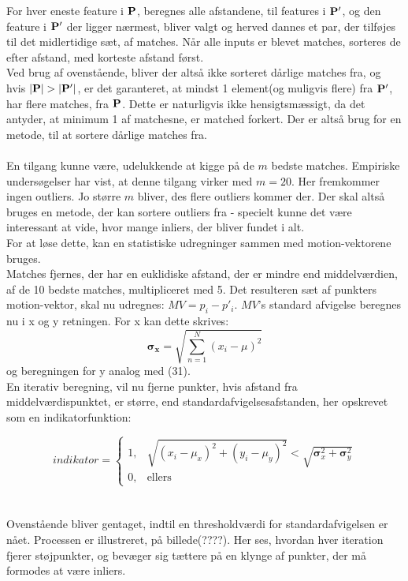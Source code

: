 For hver eneste feature i $\bold{P}$, beregnes alle afstandene, til features i $\bold{P}'$, og den feature i $\bold{P}'$ der ligger nærmest, bliver valgt og herved dannes et par, der tilføjes til det midlertidige sæt, af matches. Når alle inputs er blevet matches, sorteres de efter afstand, med korteste afstand først. 
\\
Ved brug af ovenstående, bliver der altså ikke sorteret dårlige matches fra, og hvis $|\bold{P}| > |\bold{P}'|$, er det garanteret, at mindst 1 element(og muligvis flere) fra $\bold{P}'$, har flere matches, fra $\bold{P}$. Dette er naturligvis ikke hensigtsmæssigt, da det antyder, at minimum 1 af matchesne, er matched forkert. Der er altså brug for en metode, til at sortere dårlige matches fra.
\\
\\
En tilgang kunne være, udelukkende at kigge på de $m$ bedste matches. Empiriske undersøgelser har vist, at denne tilgang virker med $m=20$. Her fremkommer ingen outliers. Jo større $m$ bliver, des flere outliers kommer der. Der skal altså bruges en metode, der kan sortere outliers fra - specielt kunne det være interessant at vide, hvor mange inliers, der bliver fundet i alt.
\\
For at løse dette, kan en statistiske udregninger sammen med motion-vektorene bruges. 
\\
Matches fjernes, der har en euklidiske afstand, der er mindre end middelværdien, af de 10 bedste matches, multipliceret med 5. Det resulteren sæt af punkters motion-vektor, skal nu udregnes: $MV = p_i - p'_i$. 
$MV$'s standard afvigelse beregnes nu i x og y retningen. For x kan dette skrives: 
\begin{equation}
\boldsymbol{\sigma_x} = \sqrt{ \sum \limits_{n=1}^N (x_i  - \mu)^2 }
\end{equation}
og beregningen for y analog med (31). \\
En iterativ beregning, vil nu fjerne punkter, hvis afstand fra middelværdispunktet, er større, end standardafvigelsesafstanden, her opskrevet som en indikatorfunktion:



\[
indikator=
\begin{cases}
    1,& \sqrt{(x_i - \mu_x)^2 + (y_i - \mu_y)^2} < \sqrt{\boldsymbol\sigma_x^2 + \boldsymbol\sigma_y^2} \\
    0,& \text{ellers}
    \end{cases}
\]
\\
\\
Ovenstående bliver gentaget, indtil en thresholdværdi for standardafvigelsen er nået. Processen er illustreret, på billede(????). Her ses, hvordan hver iteration fjerer støjpunkter, og bevæger sig tættere på en klynge af punkter, der må formodes at være inliers.